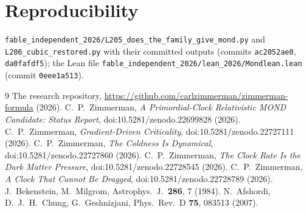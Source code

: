 \documentclass[11pt,letterpaper]{article}
\begin{document}
\section{Reproducibility}
\texttt{fable\_independent\_2026/L205\_does\_the\_family\_give\_mond.py} and \texttt{L206\_cubic\_restored.py} with their committed outputs (commits \texttt{ac2052ae0}, \texttt{da0fafdf5}); the Lean file \texttt{fable\_independent\_2026/lean\_2026/Mondlean.lean} (commit \texttt{0eee1a513}).

\begin{thebibliography}{9}
 The research repository, \url{https://github.com/carlzimmerman/zimmerman-formula} (2026).
 C.~P.~Zimmerman, \emph{A Primordial-Clock Relativistic MOND Candidate: Status Report}, doi:10.5281/zenodo.22699828 (2026).
 C.~P.~Zimmerman, \emph{Gradient-Driven Criticality}, doi:10.5281/zenodo.22727111 (2026).
 C.~P.~Zimmerman, \emph{The Coldness Is Dynamical}, doi:10.5281/zenodo.22727860 (2026).
 C.~P.~Zimmerman, \emph{The Clock Rate Is the Dark Matter Pressure}, doi:10.5281/zenodo.22728545 (2026).
 C.~P.~Zimmerman, \emph{A Clock That Cannot Be Dragged}, doi:10.5281/zenodo.22728789 (2026).
 J.~Bekenstein, M.~Milgrom, Astrophys.\ J.\ \textbf{286}, 7 (1984).
 N.~Afshordi, D.~J.~H.~Chung, G.~Geshnizjani, Phys.\ Rev.\ D \textbf{75}, 083513 (2007).
\end{thebibliography}
\end{document}
